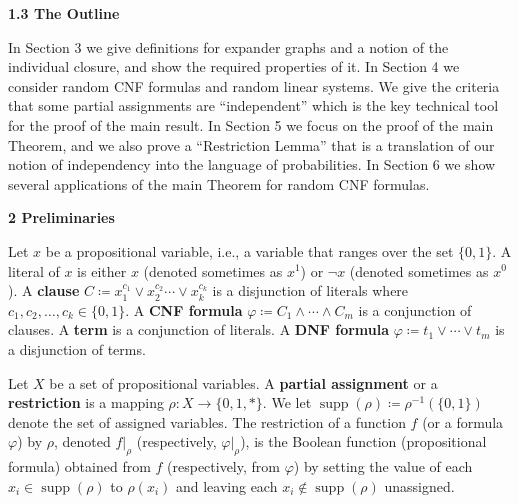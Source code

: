 \par\medskip\noindent\textbf{
1.3 The Outline}\par




In Section 3 we give definitions for expander graphs and a notion of the
individual closure, and show the required properties of it. In Section
4 we consider random CNF formulas and random linear systems. We
give the criteria that some partial assignments are “independent” which is the key technical tool for
the proof of the main result. In Section 5 we focus on the proof of the main
Theorem, and we also prove a “Restriction Lemma” that is a translation of our notion of independency
into the language of probabilities. In Section 6 we show several
applications of the main Theorem for random CNF formulas.\par






\par\medskip\noindent\textbf{
2 Preliminaries}\par




Let $x$ be a propositional variable, i.e., a variable that ranges over the set $\{0,1\}$. A literal of
$x$ is either $x$ (denoted sometimes as $x^{1}$) or $\neg x$ (denoted sometimes as $x^{0}$). A
\textbf{clause} $C\coloneqq x_{1}^{c_{1}}\lor x_{2}^{c_{2}}\cdots\lor x_{k}^{c_{k}}$ is a disjunction of
literals where $c_{1},c_{2},\dots,c_{k}\in\{0,1\}$. A \textbf{CNF formula} $\varphi\coloneqq C_{1}\land\cdots\land C_{m}$ is a conjunction of clauses. A \textbf{term} is a conjunction of literals. A
\textbf{DNF formula} $\varphi\coloneqq t_{1}\lor\cdots\lor t_{m}$ is a disjunction of terms.\par




Let $X$ be a set of propositional variables. A \textbf{partial assignment} or a \textbf{restriction} is a
mapping $\rho\colon X\to\{0,1,*\}$. We let $\operatorname*{supp}(\rho)\coloneqq\rho^{-1}(\{0,1\})$
denote the set of assigned variables. The restriction of a function $f$ (or a formula $\varphi$) by
$\rho$, denoted $f|_{\rho}$ (respectively, $\varphi|_{\rho}$), is the Boolean function (propositional
formula) obtained from $f$ (respectively, from $\varphi$) by setting the value of each $x_{i}\in\operatorname*{supp}(\rho)$ to $\rho(x_{i})$ and leaving each $x_{i}\notin\operatorname*{supp}(\rho)$ unassigned.\par




